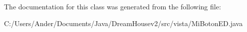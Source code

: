 The documentation for this class was generated from the following file\+:\begin{DoxyCompactItemize}
\item 
C\+:/\+Users/\+Ander/\+Documents/\+Java/\+Dream\+Housev2/src/vista/Mi\+Boton\+E\+D.\+java\end{DoxyCompactItemize}

